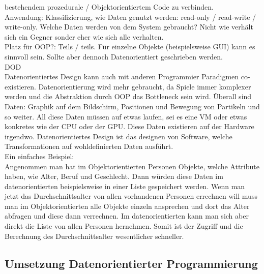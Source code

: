 bestehendem prozedurale / Objektorientiertem Code zu verbinden.\\Anwendung: Klassifizierung, wie Daten genutzt werden: read-only / read-write / write-only. Welche Daten werden von dem System gebraucht? Nicht wie verhält sich ein Gegner sonder eher wie sich alle verhalten.\\Platz für OOP?: Teils / teils. Für einzelne Objekte (beispielsweise GUI) kann es sinnvoll sein. Sollte aber dennoch Datenorientiert geschrieben werden.
\\ DOD \cite{DOD}\\
Datenorientiertes Design kann auch mit anderen Programmier Paradigmen co-existieren. Datenorientierung wird mehr gebraucht, da Spiele immer komplexer werden und die Abstraktion durch OOP das Bottleneck sein wird. Überall sind Daten: Graphik auf dem Bildschirm, Positionen und Bewegung von Partikeln und so weiter. All diese Daten müssen auf etwas laufen, sei es eine VM oder etwas konkretes wie der CPU oder der GPU. Diese Daten existieren auf der Hardware irgendwo. Datenorientiertes Design ist das designen von Software, welche Transformationen auf wohldefinierten Daten ausführt. \\
Ein einfaches Beispiel:\\Angenommen man hat im Objektorientierten Personen Objekte, welche Attribute haben, wie Alter, Beruf und Geschlecht. Dann würden diese Daten im datenorientierten beispielsweise in einer Liste gespeichert werden. Wenn man jetzt das Durchschnittsalter von allen vorhandenen Personen errechnen will muss man im Objektorientierten alle Objekte einzeln ansprechen und dort das Alter abfragen und diese dann verrechnen. Im datenorientierten kann man sich aber direkt die Liste von allen Personen hernehmen. Somit ist der Zugriff und die Berechnung des Durchschnittsalter wesentlicher schneller.
\subsection{Umsetzung Datenorientierter Programmierung}